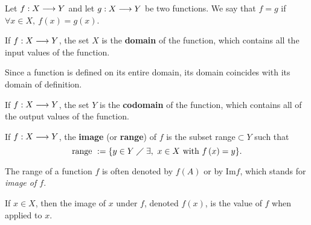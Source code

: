 
\begin{defi}
    Let $f : X\longrightarrow Y$ and let $g : X\longrightarrow Y$ be two functions. We say that $f = g$ if $\forall x\in X,\ f\left( x \right) = g\left( x \right)$.
\end{defi}

\begin{defi}[Domain]
    If $f : X\longrightarrow Y$, the set $X$ is the \textbf{domain} of the function, which contains all the input values of the function.
\end{defi}

\begin{remark}
    Since a function is defined on its entire domain, its domain coincides with its domain of definition.
\end{remark}

\begin{defi}[Codomain]
    If $f : X\longrightarrow Y$, the set $Y$ is the \textbf{codomain} of the function, which contains all of the output values of the function.
\end{defi}

\begin{defi}[Image]
    If $f : X\longrightarrow Y$, the \textbf{image} (or \textbf{range}) of $f$ is the subset range$\subset Y$ such that
    \begin{equation}
        \textrm{range }:= \{y\in Y\;\diagup\; \exists,\ x\in X\textrm{ with } f\left( x \right) = y\}.
    \end{equation}
\end{defi}

\begin{notation}
    The range of a function $f$ is often denoted by $f\left( A \right) $ or by Im$f$, which stands for \textit{image of $f$}.
\end{notation}

\begin{defi}
    If $x\in X$, then the image of $x$ under $f$, denoted $f\left( x \right) $, is the value of $f$ when applied to $x$.
\end{defi}

